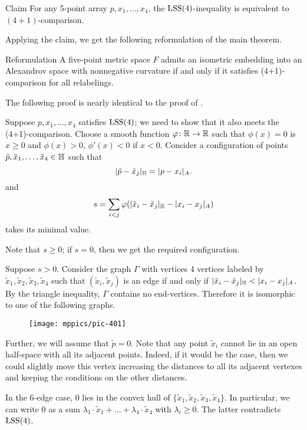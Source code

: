 \documentclass{article}
\begin{document}
\begin{thm}{Claim}\label{clm:(4+1)=LSS(4)}
For any 5-point array $p,x_1,\dots,x_4$, the
$\mathrm{LSS}(4)$-inequality is equivalent to $(4+1)$-comparison.
\end{thm}

Applying the claim, we get the following reformulation of the main theorem.

\begin{thm}{Reformulation}\label{thm:main-(4+1)}
A five-point metric space $F$ admits an isometric embedding into an Alexandrov space with nonnegative curvature
if and only if it satisfies (4+1)-comparison for all relabelings.
\end{thm}

The following proof is nearly identical to the proof of \cite[Proposition 4.1]{lebedeva-petrunin-zolotov}.

Suppose $p,x_1,\dots,x_4$ satisfies $\mathrm{LSS}(4)$;
we need to show that it also meets the (4+1)-comparison.
Choose a smooth function $\varphi\colon\mathbb{R}\to \mathbb{R}$ such that $\phi(x)=0$ is $x\ge0$ and $\phi(x)>0$, $\phi'(x)<0$ if $x<0$.
Consider a configuration of points $\tilde p,\tilde x_1,\dots,\tilde x_4\in \mathbb H$ such that 
\[
|\tilde p-\tilde x_j|_{\mathbb H}=|p-x_i|_{A}.
\]
and
\[
s=\sum_{i<j}\varphi(|\tilde x_i-\tilde x_j|_{\mathbb H}- |x_i-x_j|_{A})
\]
takes its minimal value.

Note that $s\ge0$;
if $s=0$, then we get the required configuration.

Suppose $s>0$.
Consider the graph $\Gamma$ with vertices 4 vertices labeled by $\tilde x_1,\tilde x_2,\tilde x_3,\tilde x_4$ such that 
$(\tilde x_i,\tilde x_j)$ is an edge if and only if $|\tilde x_i-\tilde x_j|_{\HH}<|x_i-x_j|_{A}$.
By the triangle inequality, $\Gamma$ contains no end-vertices.
Therefore it is isomorphic to one of the following graphs.

\begin{figure}[ht!]
\centering
\texttt{[image: mppics/pic-401]}
\end{figure}

Further, we will assume that $\tilde p=0$.
Note that any point $\tilde x_i$ cannot lie in an open half-space with all its
adjacent points.
Indeed, if it would be the case, then we could slightly move this
vertex increasing the distances to all its adjacent vertexes and keeping the conditions on the other distances.

In the 6-edge case, $0$ lies in the convex hull of $\{\tilde x_1,\tilde x_2,\tilde x_3,\tilde x_4\}$.
In particular, we can write $0$ as a sum $\lambda_1\cdot \tilde x_1+\dots+\lambda_4\cdot\tilde x_4$ with $\lambda_i\ge0$.
The latter contradicts $\mathrm{LSS}(4)$.
\end{document}
